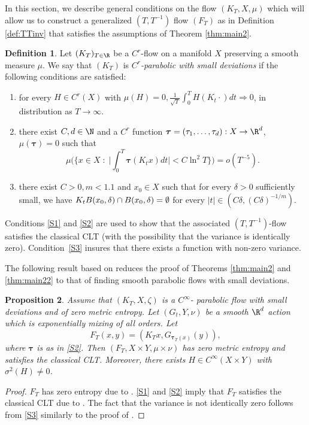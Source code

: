 \documentclass[10pt]{amsart}
\let\DS\relax
\newcommand\btau{{\boldsymbol{\tau}}}
\theoremstyle{definition}
\newtheorem{definition}{Definition}
\theoremstyle{plain}
\newtheorem{proposition}[definition]{Proposition}
\begin{document}
In this section, we describe general conditions on the flow $(K_T,X,\mu)$ which will allow us to construct a generalized $(T,T^{-1})$ flow $(F_T)$ as in Definition \ref{def:TTinv} that satisfies the assumptions of Theorem \ref{thm:main2}.

\begin{definition}\label{def:parflow} Let $(K_T)_{T\in \R}$ be a $C^r$-flow on a manifold $X$ preserving a smooth measure $\mu$. We say that $(K_T)$ is \emph{$C^r$-parabolic with small deviations}
if the following conditions are satisfied:
\begin{enumerate}\renewcommand{\theenumi}{\textup{S}\arabic{enumi}}
\item\label{S1}
for every $H\in C^r(X)$ with $\mu(H)=0$$,
\frac{1}{\sqrt{T}}\int_0^T H(K_t\cdot )dt \Rightarrow 0$,
in distribution as $T\to\infty$.
\item\label{S2}
there exist $C,d\in \N$ and a $C^r$ function ${\btau}=(\tau_1,\ldots,\tau_d):X\to \R^d$, $\mu(\btau)=0$ such that
\[
\mu\Big(\{x\in X\;:\; \Big|\int_0^T\btau(K_tx)dt\Big|<C\ln^2 T \}\Big)=o(T^{-5}).
\]
\item\label{S3}
there exist $C>0, m <1.1$ and $x_0\in X$ such that for every $\delta>0$ sufficiently small, we have
$\DS
K_tB(x_0,\delta)\cap B(x_0,\delta)=\emptyset
$
for every $|t|\in (C\delta, (C\delta)^{-1/m})$.
\end{enumerate}
\end{definition}

Conditions \eqref{S1} and \eqref{S2} are used to show that the associated $(T,T^{-1})$-flow satisfies the classical CLT (with the possibility that the variance is identically zero). Condition~\eqref{S3}
insures that there exists a function with non-zero variance.

The following result based on \cite[Th.\,3.2]{DDKN} reduces the proof of
Theorems \ref{thm:main2} and \ref{thm:main22} to that of finding smooth parabolic flows with small deviations.

\begin{proposition}\label{prop:1} Assume that $(K_T,X,\zeta)$ is a $C^\infty$- parabolic flow with small deviations and of zero metric entropy. Let $(G_t,Y,\nu)$ be a smooth $\R^d$ action which is exponentially mixing of all orders. Let
\[
F_T(x,y)=(K_Tx, G_{\btau_T(x)}(y)),
\] where $\btau$ is as in \eqref{S2}. Then $(F_T,X\times Y,\mu \times \nu)$ has zero metric entropy and satisfies the classical CLT. Moreover, there exists $H\in C^\infty(X\times Y)$ with $\sigma^2(H)\neq 0$.
\end{proposition}
\begin{proof}
$F_T$ has zero entropy due to \cite[Lem.\,2.1]{DDKN}.
\eqref{S1} and \eqref{S2} imply that $F_T$ satisfies the classical CLT due to
\cite[Th.\,3.2]{DDKN}.
The fact that the variance is not identically zero follows from \eqref{S3} similarly
to the proof of \cite[Lem.\,8.2]{DDKN}.
\end{proof}
\end{document}
